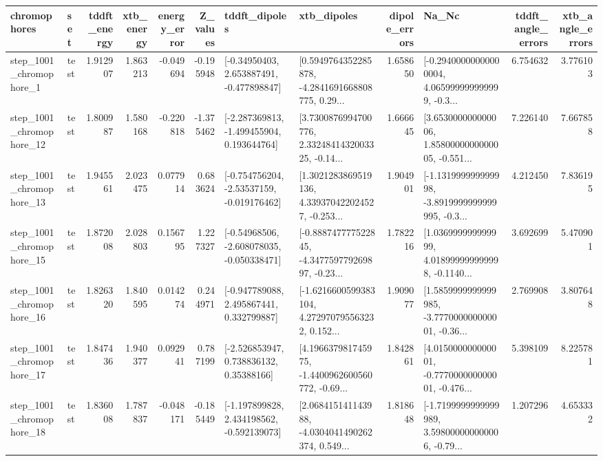 \begin{tabular}{llrrrrllrlrr}
\toprule
             chromophores &       set &  tddft\_energy &  xtb\_energy &  energy\_error &  Z\_values &                               tddft\_dipoles &                                        xtb\_dipoles &  dipole\_errors &                                              Na\_Nc &  tddft\_angle\_errors &  xtb\_angle\_errors \\
\midrule
  step\_1001\_chromophore\_1 &      test &      1.912907 &    1.863213 &     -0.049694 & -0.195948 &    [-0.34950403, 2.653887491, -0.477898847] &  [0.5949764352285878, -4.2841691668808775, 0.29... &       1.658650 &  [-0.29400000000000004, 4.065999999999999, -0.3... &            6.754632 &          3.776103 \\
 step\_1001\_chromophore\_12 &      test &      1.800987 &    1.580168 &     -0.220818 & -1.375462 &   [-2.287369813, -1.499455904, 0.193644764] &  [3.7300876994700776, 2.3324841432003325, -0.14... &       1.666645 &  [3.653000000000006, 1.8580000000000005, -0.551... &            7.226140 &          7.667858 \\
 step\_1001\_chromophore\_13 &      test &      1.945561 &    2.023475 &      0.077914 &  0.683624 &   [-0.754756204, -2.53537159, -0.019176462] &  [1.3021283869519136, 4.339370422024527, -0.253... &       1.904901 &  [-1.131999999999998, -3.8919999999999995, -0.3... &            4.212450 &          7.836195 \\
 step\_1001\_chromophore\_15 &      test &      1.872008 &    2.028803 &      0.156795 &  1.227327 &   [-0.54968506, -2.608078035, -0.050338471] &  [-0.888747777522845, -4.347759779269897, -0.23... &       1.782216 &  [1.036999999999999, 4.018999999999998, -0.1140... &            3.692699 &          5.470901 \\
 step\_1001\_chromophore\_16 &      test &      1.826320 &    1.840595 &      0.014274 &  0.244971 &    [-0.947789088, 2.495867441, 0.332799887] &  [-1.6216600599383104, 4.272970795563232, 0.152... &       1.909077 &  [1.5859999999999985, -3.777000000000001, -0.36... &            2.769908 &          3.807648 \\
 step\_1001\_chromophore\_17 &      test &      1.847436 &    1.940377 &      0.092941 &  0.787199 &     [-2.526853947, 0.738836132, 0.35388166] &  [4.196637981745975, -1.4400962600560772, -0.69... &       1.842861 &  [4.015000000000001, -0.777000000000001, -0.476... &            5.398109 &          8.225781 \\
 step\_1001\_chromophore\_18 &      test &      1.836008 &    1.787837 &     -0.048171 & -0.185449 &   [-1.197899828, 2.434198562, -0.592139073] &  [2.068415141143988, -4.0304041490262374, 0.549... &       1.818648 &  [-1.7199999999999989, 3.598000000000006, -0.79... &            1.207296 &          4.653332 \\

\end{tabular}
